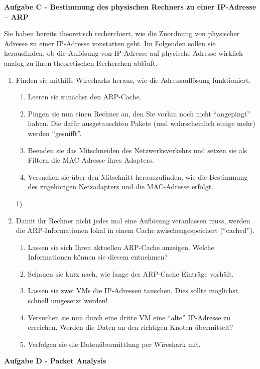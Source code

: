 \documentclass[paper=a4,fontsize=11pt]{scrartcl}%
\begin{document}
\begin{center}
\Large{\textbf{Aufgabe C - Bestimmung des physischen Rechners zu einer IP-Adresse -- ARP}}
\end{center}\vskip0.25in
Sie haben bereits theoretisch recherchiert, wie die Zuordnung von physischer Adresse zu einer IP-Adresse vonstatten geht. Im Folgenden sollen sie herausfinden, ob die Auflösung von IP-Adresse auf physische Adresse wirklich analog zu ihren theoretischen Recherchen abläuft.
\begin{enumerate}
	\item Finden sie mithilfe Wiresharks heraus, wie die Adressauflösung funktioniert.
		\begin{enumerate}
			\item Leeren sie zunächst den ARP-Cache.
			\item Pingen sie nun einen Rechner an, den Sie vorhin noch nicht \enquote{angepingt} haben. Die dafür ausgetauschten Pakete (und wahrscheinlich einige mehr) werden \enquote{gesnifft}.
			\item Beenden sie das Mitschneiden des Netzwerksverkehrs und setzen sie als Filtern die MAC-Adresse ihres Adapters.
			\item Versuchen sie über den Mitschnitt herauszufinden, wie die Bestimmung des zugehörigen Netzadapters und die MAC-Adresse erfolgt.
		\end{enumerate}1)
	\item Damit ihr Rechner nicht jedes mal eine Auflösung veranlassen muss, werden die ARP-Informationen lokal in einem Cache zwischengespeichert (\enquote{cached}).
\begin{enumerate}
	\item Lassen sie sich Ihren aktuellen ARP-Cache anzeigen. Welche Informationen können sie diesem entnehmen?
	\item Schauen sie kurz nach, wie lange der ARP-Cache Einträge vorhält.
	\item Lassen sie zwei VMs die IP-Adressen tauschen. Dies sollte möglichst schnell umgesetzt werden!
	\item Versuchen sie nun durch eine dritte VM eine \enquote{alte} IP-Adresse zu erreichen. Werden die Daten an den richtigen Knoten übermittelt?
	\item Verfolgen sie die Datenübermittlung per Wireshark mit.
\end{enumerate}
\end{enumerate}

\begin{center}
\Large{\textbf{Aufgabe D - Packet Analysis}}
\end{center}\vskip0.25in
\end{document}
